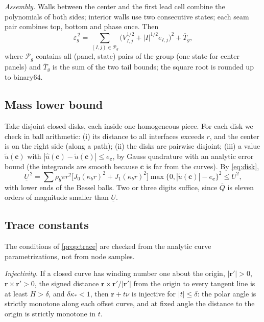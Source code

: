 \emph{Assembly.} Walls between the center and the first lead cell combine the
polynomials of both sides; interior walls use two consecutive states; each seam pair
combines top, bottom and phase once. Then
\begin{equation}\label{sm:eq-eps}
  \overline\varepsilon_g^{\,2}=\sum_{(I,j)\in\mathscr P_g}\bigl(V_{I,j}^{1/2}+|I|^{1/2}e_{I,j}\bigr)^2
  +\overline T_g ,
\end{equation}
where $\mathscr P_g$ contains all (panel, state) pairs of the group (one state for
center panels) and $\overline T_g$ is the sum of the two tail bounds; the square
root is rounded up to binary64.

\subsection{Mass lower bound}\label{sm:reliable-mass}
Take disjoint closed disks, each inside one homogeneous piece. For each disk we
check in ball arithmetic: (i) its distance to all interfaces exceeds $r$, and the
center is on the right side (along a path); (ii) the disks are pairwise disjoint;
(iii) a value $\widetilde u(\mathbf c)$ with $|\widehat u(\mathbf c)-\widetilde
u(\mathbf c)|\le e_{\mathbf c}$, by Gauss quadrature with an analytic error bound
(the integrands are smooth because $\mathbf c$ is far from the curves). By
\eqref{eq:disk},
\[
  \underline U^{\,2}=\sum\rho_b\pi r^2\bigl[J_0(\kappa_br)^2+J_1(\kappa_br)^2\bigr]
  \max\{0,|\widetilde u(\mathbf c)|-e_{\mathbf c}\}^2\le U^2 ,
\]
with lower ends of the Bessel balls. Two or three digits suffice, since
$\overline Q$ is eleven orders of magnitude smaller than $\underline U$.

\subsection{Trace constants}\label{sm:reliable-cg}
The conditions of \cref{prop:trace} are checked from the analytic curve
parametrizations, not from node samples.

\emph{Injectivity.} If a closed curve has winding number one about the origin,
$|\boldsymbol r'|>0$, $\boldsymbol r\times\boldsymbol r'>0$, the signed distance
$\boldsymbol r\times\boldsymbol r'/|\boldsymbol r'|$ from the origin to every tangent
line is at least $H>\delta$, and $\delta\kappa_*<1$, then $\boldsymbol r+t\nu$ is
injective for $|t|\le\delta$: the polar angle is strictly monotone along each offset
curve, and at fixed angle the distance to the origin is strictly monotone in $t$.

